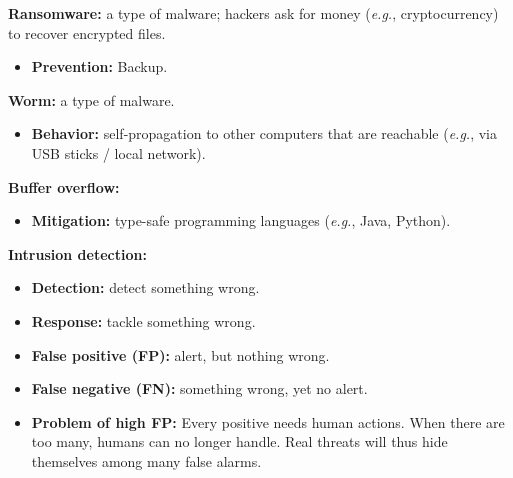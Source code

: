 \documentclass{article}
\newcommand{\parhead}[1]{\noindent \textbf{#1}}
\begin{document}
\parhead{Ransomware:} a type of malware; hackers ask for money (\emph{e.g.}, cryptocurrency) to recover encrypted files.
\begin{itemize}
    \item \textbf{Prevention:} Backup. 
\end{itemize}

\parhead{Worm:} a type of malware.
\begin{itemize}
    \item \textbf{Behavior:} self-propagation to other computers that are reachable (\emph{e.g.}, via USB sticks / local network). 
\end{itemize}

\parhead{Buffer overflow:} 
\begin{itemize}
    \item \textbf{Mitigation:} type-safe programming languages (\emph{e.g.}, Java, Python).
\end{itemize}

\parhead{Intrusion detection:} 
\begin{itemize}
    \item \textbf{Detection:} detect something wrong.
    
    \item \textbf{Response:} tackle something wrong.
    
    \item \textbf{False positive (FP):} alert, but nothing wrong.
    
    \item \textbf{False negative (FN):} something wrong, yet no alert.
    
    \item \textbf{Problem of high FP:} Every positive needs human actions. When there are too many, humans can no longer handle. Real threats will thus hide themselves among many false alarms.
\end{itemize}
\end{document}
